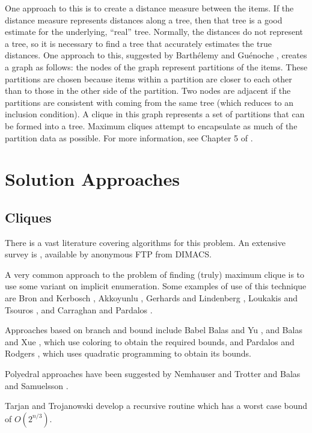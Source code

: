 One approach to this is to create a distance measure between the
items.  If the distance measure represents distances along a tree,
then that tree is a good estimate for the underlying, ``real'' tree.
Normally, the distances do not represent a tree, so it is necessary to
find a tree that accurately estimates the true distances.  One
approach to this, suggested by Barth\'elemy and Gu\'enoche
\cite{BaGu91}, creates a graph as follows: the nodes of the graph
represent partitions of the items.  These partitions are chosen
because items within a partition are closer to each other than to
those in the other side of the partition.  Two nodes are adjacent if
the partitions are consistent with coming from the same tree (which
reduces to an inclusion condition).  A clique in this graph represents
a set of partitions that can be formed into a tree.  Maximum cliques
attempt to encapsulate as much of the partition data as possible.  For
more information, see Chapter 5 of \cite{BaGu91}.

\section{Solution Approaches}
\label{sec:alg}

\subsection{Cliques} 
There is a vast literature covering algorithms for this problem.
An extensive survey is \cite{PaXu93}, available by anonymous FTP from DIMACS.

A very common approach to the problem of finding (truly) maximum clique
is to use some variant on implicit enumeration.
Some examples of use of this technique are Bron and Kerbosch \cite{BrKe73},
Akkoyunlu \cite{Ak73}, Gerhards and Lindenberg \cite{GeLi79},
Loukakis and Tsouros \cite{LoTs82}, and Carraghan and Pardalos \cite{CaPa90}.

Approaches based on branch and bound include Babel \cite{Ba91}
Balas and Yu \cite{BaYu86}, and Balas and Xue \cite{BaXu91}, which use
coloring to obtain the required bounds, and Pardalos and Rodgers \cite{PaRo92},
which uses quadratic programming to obtain its bounds.

Polyedral approaches have been suggested by Nemhauser and Trotter
\cite{NeTr75} and Balas and Samuelsson \cite{BaSa77}.  

Tarjan and Trojanowski \cite{TaTr77} develop a recursive routine which
has a worst case bound of $O(2^{n/3})$.

